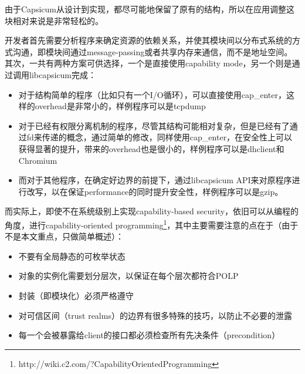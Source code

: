 由于Capsicum从设计到实现，都尽可能地保留了原有的结构，所以在应用调整这块相对来说是非常轻松的。

开发者首先需要分析程序来确定资源的依赖关系，并使其模块间以分布式系统的方式沟通，即模块间通过message-passing或者共享内存来通信，而不是地址空间。其次，一共有两种方案可供选择，一个是直接使用capability mode，另一个则是通过调用libcapsicum完成：
\begin{itemize}
	\item
	对于结构简单的程序（比如只有一个I/O循环），可以直接使用cap\_enter，这样的overhead是非常小的，样例程序可以是tcpdump
	\item
	对于已经有权限分离机制的程序，尽管其结构可能相对复杂，但是已经有了通过fd来传递的概念，通过简单的修改，同样使用cap\_enter，在安全性上可以获得显著的提升，带来的overhead也是很小的，样例程序可以是dhclient和Chromium
	\item
	而对于其他程序，在确定好边界的前提下，通过libcapsicum API来对原程序进行改写，以在保证performance的同时提升安全性，样例程序可以是gzip。
\end{itemize}

而实际上，即使不在系统级别上实现capability-based security，依旧可以从编程的角度，进行capability-oriented programming\footnote{http://wiki.c2.com/?CapabilityOrientedProgramming}，其中主要需要注意的点在于（由于不是本文重点，只做简单概述）：
\begin{itemize}
	\item
	不要有全局静态的可枚举状态
	\item
	对象的实例化需要划分层次，以保证在每个层次都符合POLP
	\item
	封装（即模块化）必须严格遵守
	\item
	对可信区间（trust realms）的边界有很多特殊的技巧，以防止不必要的泄露
	\item
	每一个会被暴露给client的接口都必须检查所有先决条件（precondition）
\end{itemize}
